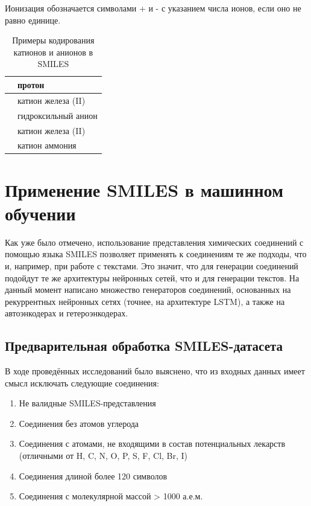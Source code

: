 \documentclass[a4paper,14pt]{extreport}
\begin{document}
\begin{table}[H]
Ионизация обозначается символами + и - с указанием числа ионов, если оно не равно единице.
\begin{center}
\begin{tabular}{|l|l|}
\hline
	[H+] & протон\\
\hline
	[Fe++2] & катион железа (II)\\
\hline
	[OH-] & гидроксильный анион\\
\hline
	[Fe++] & катион железа (II)\\
\hline
	[NH4+] & катион аммония\\
\hline
\end{tabular}
\caption{Примеры кодирования катионов и анионов в SMILES}
\end{center}
\end{table}

  \section{Применение SMILES в машинном обучении}
  \label{s:smiles_application}
  Как уже было отмечено, использование представления химических соединений с помощью языка SMILES позволяет применять к соединениям те же подходы, что и, например, при работе с текстами. Это значит, что для генерации соединений подойдут те же архитектуры нейронных сетей, что и для генерации текстов. На данный момент написано множество генераторов соединений, основанных на рекуррентных нейронных сетях (точнее, на архитектуре LSTM), а также на автоэнкодерах и гетероэнкодерах.
  \subsection{Предварительная обработка SMILES-датасета}
  \label{ss:smiles_preprocessing_subsec}
  В ходе проведённых исследований было выяснено, что из входных данных имеет смысл исключать следующие соединения:
  \begin{enumerate}
  \item Не валидные SMILES-представления
  \item Соединения без атомов углерода
  \item Соединения с атомами, не входящими в состав потенциальных лекарств (отличными от H, C, N, O, P, S, F, Cl, Br, I)
  \item Соединения длиной более 120 символов
  \item Соединения с молекулярной массой > 1000 а.е.м.

  \end{enumerate}
  
\end{document}
